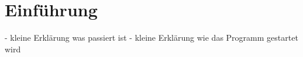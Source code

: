 \section*{Einführung}
- kleine Erklärung was passiert ist
- kleine Erklärung wie das Programm gestartet wird

